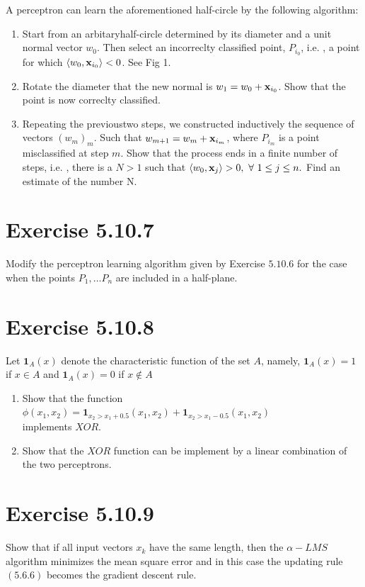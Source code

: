 \documentclass{exam}
\begin{document}
A perceptron can learn the aforementioned half-circle by the following algorithm:\\

\begin{enumerate}[label*=\arabic*.]
    \item Start from an arbitaryhalf-circle determined by its diameter and a unit normal vector $w_0$. Then select an incorreclty classified point, $P_{i_0}$, i.e.
    , a point for which $\left< w_0, \bold{x}_{i_0}\right> < 0$. See Fig 1. 
    \item Rotate the diameter that the new normal is $w_1 = w_0 + \bold{x}_{i_0}$. Show that the point is now correclty classified.
    \item Repeating the previoustwo steps, we constructed inductively the sequence of vectors $(w_m)_{m}$. Such that $w_{m+1} = w_m + \bold{x}_{i_m}$, where $P_{i_m}$ is 
    a point misclassified at step $m$. Show that the process ends in a finite number of steps, i.e. , there is a $N > 1$ such that $\left< w_0, \bold{x}_{j}\right> > 0, \  \forall \ 1 \leq j \leq n.$ 
    Find an estimate of the number N.
\end{enumerate}

\section*{Exercise 5.10.7}
Modify the perceptron learning algorithm given by Exercise $5.10.6$ for the case when the points $P_1, \ldots P_n$ are included in a half-plane.

\section*{Exercise 5.10.8}
Let $\boldsymbol{1}_{A}(x)$ denote the characteristic function of the set $A$, namely, $\boldsymbol{1}_{A}(x) = 1$ if $x \in A$ and $\boldsymbol{1}_{A}(x) = 0$ if $x \notin A$
\begin{enumerate}
    \item Show that the function
    $\phi(x_1,x_2) = \boldsymbol{1}_{x_2 > x_1 + 0.5}(x_1,x_2) + \boldsymbol{1}_{x_2 > x_1 - 0.5}(x_1,x_2)$ \\
    implements $XOR$.
    \item Show that the $XOR$ function can be implement by a linear combination of the two perceptrons.
\end{enumerate}

\section*{Exercise 5.10.9}
Show that if all input vectors $x_k$ have the same length, then the $\alpha-LMS$ algorithm minimizes the mean square error and in this case the updating 
rule $(5.6.6)$ becomes the gradient descent rule.
\end{document}
